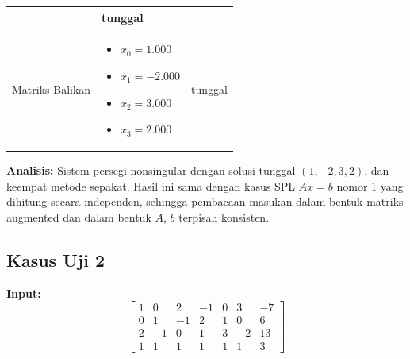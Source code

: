 \documentclass[12pt,a4paper]{report}
\begin{document}
\begin{table}[H]
\begin{tabular}{|l|p{5cm}|l|}
\begin{itemize}
        \end{itemize}
        & tunggal \\
        \hline
        Matriks Balikan & 
        \begin{itemize}
            \item $x_0 = 1.000$
            \item $x_1 = -2.000$
            \item $x_2 = 3.000$
            \item $x_3 = 2.000$
        \end{itemize}
        & tunggal \\
        \hline
    \end{tabular}
\end{table}

\textbf{Analisis:} Sistem persegi nonsingular dengan solusi tunggal $(1,-2,3,2)$, dan keempat metode sepakat. Hasil ini sama dengan kasus SPL $Ax=b$ nomor 1 yang dihitung secara independen, sehingga pembacaan masukan dalam bentuk matriks augmented dan dalam bentuk $A$, $b$ terpisah konsisten.

\subsection{Kasus Uji 2}
\textbf{Input:}
\[
\left[\begin{array}{cccccc|c}
     1& 0 &2 &-1 &0 &3 &-7 \\
    0 &1 &-1 &2 &1 &0& 6 \\
    2 &-1 &0& 1& 3 &-2 &13 \\
    1 &1 &1 &1 &1 &1 &3
\end{array}\right]
\]
 
\end{document}
